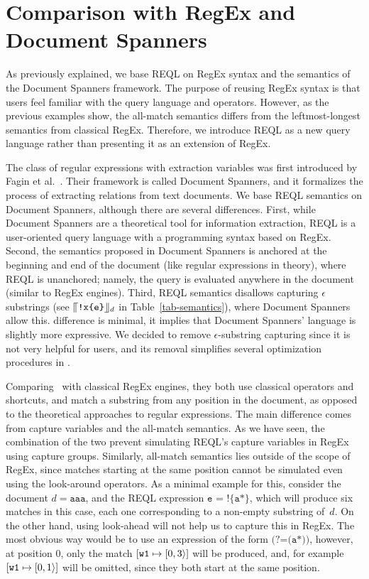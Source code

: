 \section{Comparison with RegEx and Document Spanners} 
As previously explained, we base REQL on RegEx syntax and the semantics of the
Document Spanners framework. The purpose of reusing RegEx syntax is that users
feel familiar with the query language and operators. However, as the previous
examples show, the all-match semantics differs from the leftmost-longest
semantics from classical RegEx. Therefore, we introduce REQL as a new query
language rather than presenting it as an extension of RegEx. 

The class of regular expressions with extraction variables was first introduced
by Fagin et al.~\cite{FaginKRV15}. Their framework is called Document Spanners,
and it formalizes the process of extracting relations from text documents. We
base REQL semantics on Document Spanners, although there are several
differences. First, while Document Spanners are a theoretical tool for
information extraction, REQL is a user-oriented query language with a
programming syntax based on RegEx. Second, the semantics proposed in Document
Spanners is anchored at the beginning and end of the document (like regular
expressions in theory), where REQL is unanchored; namely, the query is evaluated
anywhere in the document (similar to RegEx engines). Third, REQL semantics
disallows capturing $\epsilon$ substrings (see $\llceil{\texttt{!x\{e\}}}\rrfloor_{d}$ in
Table~\ref{tab-semantics}), where Document Spanners allow this. %
difference is minimal, it implies that Document Spanners' language is slightly
more expressive. 
We decided to remove $\epsilon$-substring capturing since it is not very helpful
for users, and its removal simplifies several optimization procedures in
\rematch.

Comparing \rematch\ with classical RegEx engines, they both use classical
operators and shortcuts, and  match a substring from any position in the
document, as opposed to the theoretical approaches to regular expressions. The
main difference comes from capture variables and the all-match semantics. As we
have seen, the combination of the two prevent simulating REQL's capture
variables in RegEx using capture groups. Similarly, all-match semantics lies
outside of the scope of RegEx, since matches starting at the same position
cannot be simulated even using the look-around operators. As a minimal example
for this, consider the document $d = \texttt{aaa}$, and the REQL expression
$\texttt{e = !\{a*\}}$, which will produce six matches in this case, each one
corresponding to a non-empty substring of~$d$. On the other hand, using
look-ahead will not help us to capture this in RegEx. The most obvious way would
be to use an expression of the form $\texttt{(?=(a*))}$, however, at position 0,
only the match $[\texttt{w1} \mapsto [0, 3\rangle]$ will be produced, and, for
example $[\texttt{w1} \mapsto [0, 1\rangle]$ will be omitted, since they both
start at the same position.


